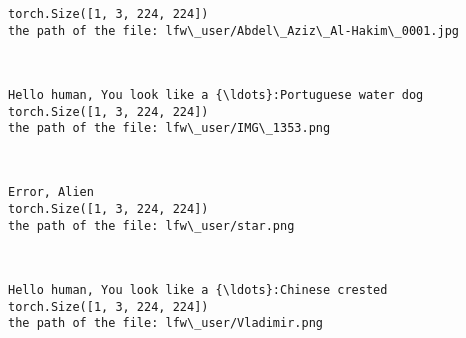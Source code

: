 \documentclass[11pt]{article}
\begin{document}
    \begin{Verbatim}[commandchars=\\\{\}]
torch.Size([1, 3, 224, 224])
the path of the file: lfw\_user/Abdel\_Aziz\_Al-Hakim\_0001.jpg

    \end{Verbatim}

    \begin{center}
    \end{center}
    { \hspace*{\fill} \\}
    
    \begin{Verbatim}[commandchars=\\\{\}]
Hello human, You look like a {\ldots}:Portuguese water dog
torch.Size([1, 3, 224, 224])
the path of the file: lfw\_user/IMG\_1353.png

    \end{Verbatim}

    \begin{center}
    \end{center}
    { \hspace*{\fill} \\}
    
    \begin{Verbatim}[commandchars=\\\{\}]
Error, Alien
torch.Size([1, 3, 224, 224])
the path of the file: lfw\_user/star.png

    \end{Verbatim}

    \begin{center}
    \end{center}
    { \hspace*{\fill} \\}
    
    \begin{Verbatim}[commandchars=\\\{\}]
Hello human, You look like a {\ldots}:Chinese crested
torch.Size([1, 3, 224, 224])
the path of the file: lfw\_user/Vladimir.png

    \end{Verbatim}

    \begin{center}
    \end{center}
    { \hspace*{\fill} \\}
    
\end{document}

